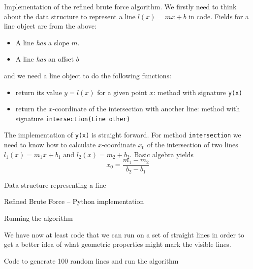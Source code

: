 \documentclass{article}
\begin{document}
\begin{frame}{Implementation of the refined brute force algorithm.}
    We firstly need to think about the data structure to represent a
    line $l(x) = mx+b$ in code. Fields for a line object are from the
    above: 
    \begin{itemize}
    \item A line \emph{has} a slope $m$.
    \item A line \emph{has} an offset $b$
    \end{itemize}
    and we need a line object to do the following functions:
    \begin{itemize}
    \item return its value $y = l(x)$ for a given point $x$: method with signature \texttt{y(x)}
    \item return the $x$-coordinate of the intersection with another line: method with signature \texttt{intersection(Line other)}
    \end{itemize}
    The implementation of \texttt{y(x)} is straight forward. For
    method \texttt{intersection} we need to know how to calculate
    $x$-coordinate $x_0$ of the 
    intersection of two lines $l_1(x) = m_1x + b_1$ and $l_2(x) = m_2 +
    b_2$. Basic algebra yields
    \begin{equation}
      x_0 = \frac{m_1 - m_2}{b_2 - b_1}
    \end{equation}
\end{frame}

\begin{frame}{Data structure representing a line}

\tiny

\end{frame}

\begin{frame}{Refined Brute Force -- Python implementation}
\tiny

\end{frame}

\begin{frame}{Running the algorithm}

We have now at least code that we can run on a set of straight lines
in order to get a better idea of what geometric properties might mark
the visible lines.

\begin{block}{Code to generate 100 random lines and run the algorithm}
\tiny

\end{block}
\end{frame}
\end{document}
